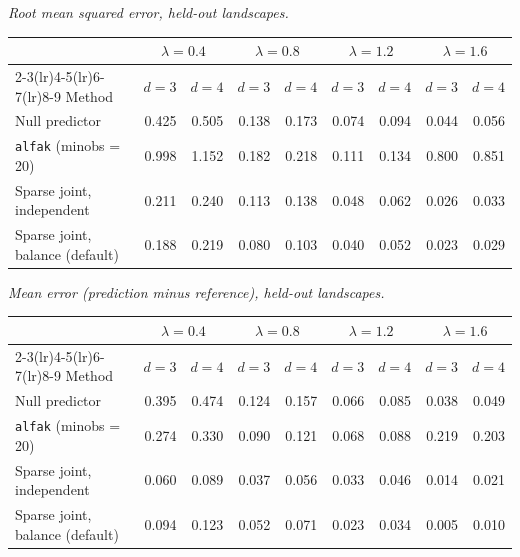 \par\medskip\noindent\begin{minipage}{\linewidth}
\textit{Root mean squared error, held-out landscapes.}
\begin{center}
\footnotesize
\setlength{\tabcolsep}{3.5pt}
\begin{tabular}{l*{8}{r}}
\toprule
 & \multicolumn{2}{c}{$\lambda=0.4$} & \multicolumn{2}{c}{$\lambda=0.8$} & \multicolumn{2}{c}{$\lambda=1.2$} & \multicolumn{2}{c}{$\lambda=1.6$} \\
\cmidrule(lr){2-3}\cmidrule(lr){4-5}\cmidrule(lr){6-7}\cmidrule(lr){8-9}
Method & $d=3$ & $d=4$ & $d=3$ & $d=4$ & $d=3$ & $d=4$ & $d=3$ & $d=4$ \\
\midrule
Null predictor & 0.425 & 0.505 & 0.138 & 0.173 & 0.074 & 0.094 & 0.044 & 0.056 \\
\texttt{alfak} (minobs = 20) & 0.998 & 1.152 & 0.182 & 0.218 & 0.111 & 0.134 & 0.800 & 0.851 \\
Sparse joint, independent & 0.211 & 0.240 & 0.113 & 0.138 & 0.048 & 0.062 & 0.026 & 0.033 \\
Sparse joint, balance (default) & 0.188 & 0.219 & 0.080 & 0.103 & 0.040 & 0.052 & 0.023 & 0.029 \\
\bottomrule
\end{tabular}
\end{center}
\end{minipage}

\par\medskip\noindent\begin{minipage}{\linewidth}
\textit{Mean error (prediction minus reference), held-out landscapes.}
\begin{center}
\footnotesize
\setlength{\tabcolsep}{3.5pt}
\begin{tabular}{l*{8}{r}}
\toprule
 & \multicolumn{2}{c}{$\lambda=0.4$} & \multicolumn{2}{c}{$\lambda=0.8$} & \multicolumn{2}{c}{$\lambda=1.2$} & \multicolumn{2}{c}{$\lambda=1.6$} \\
\cmidrule(lr){2-3}\cmidrule(lr){4-5}\cmidrule(lr){6-7}\cmidrule(lr){8-9}
Method & $d=3$ & $d=4$ & $d=3$ & $d=4$ & $d=3$ & $d=4$ & $d=3$ & $d=4$ \\
\midrule
Null predictor & 0.395 & 0.474 & 0.124 & 0.157 & 0.066 & 0.085 & 0.038 & 0.049 \\
\texttt{alfak} (minobs = 20) & 0.274 & 0.330 & 0.090 & 0.121 & 0.068 & 0.088 & 0.219 & 0.203 \\
Sparse joint, independent & 0.060 & 0.089 & 0.037 & 0.056 & 0.033 & 0.046 & 0.014 & 0.021 \\
Sparse joint, balance (default) & 0.094 & 0.123 & 0.052 & 0.071 & 0.023 & 0.034 & 0.005 & 0.010 \\
\bottomrule
\end{tabular}
\end{center}
\end{minipage}

